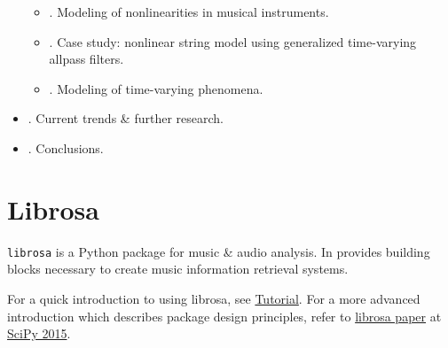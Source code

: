 \documentclass{article}
\begin{document}
\begin{itemize}
	\begin{itemize}
		\item {. Modeling of nonlinearities in musical instruments.}
		\item {. Case study: nonlinear string model using generalized time-varying allpass filters.}
		\item {. Modeling of time-varying phenomena.}
	\end{itemize}
	\item {. Current trends \& further research.}
	\item {. Conclusions.}
\end{itemize}


\section{Librosa}
{\tt librosa} is a Python package for music \& audio analysis. In provides building blocks necessary to create music information retrieval systems.

For a quick introduction to using librosa, see \href{https://librosa.org/doc/latest/tutorial.html}{Tutorial}. For a more advanced introduction which describes package design principles, refer to \href{https://doi.org/10.25080/Majora-7b98e3ed-003}{librosa paper} at \href{https://scipy2015.scipy.org/}{SciPy 2015}.
\end{document}
